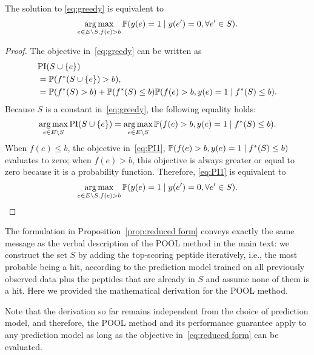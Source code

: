 \begin{proposition} \label{prop:reduced form}
  The solution to \eqref{eq:greedy} is equivalent to
  \begin{equation}
    \underset{e \in E \backslash S, f(e) > b}{\mathrm{arg}\max} \, \mathbb{P} (y(e)=1 \mid y(e') = 0, \forall e' \in S).
    \label{eq:reduced form}
  \end{equation}
\end{proposition}
\begin{proof}
  The objective in~\eqref{eq:greedy} can be written as
  \begin{equation*}
    \begin{split}
      &\text{PI}(S \cup \{e\}) \\
      &= \mathbb{P}(f^*(S\cup \{e\}) > b),\\
      &= \mathbb{P}(f^*(S) > b) + \mathbb{P}(f^*(S)\leq b) \mathbb{P}(f(e) > b, y(e) = 1 \mid f^*(S)\leq b).
    \end{split}
  \end{equation*}
  Because $S$ is a constant in~\eqref{eq:greedy}, the following equality holds:
  \begin{equation} \label{eq:PI1} 
    \underset{e \in E \backslash S}{\arg\max} \, \text{PI}(S \cup \{e\}) = \underset{e \in E \backslash S}{\arg\max} \, \mathbb{P}(f(e) > b, y(e)=1 \mid f^*(S)\leq b).
  \end{equation}
  When $f(e) \leq b$, the objective in~\eqref{eq:PI1}, $\mathbb{P}(f(e) > b, y(e) = 1 \mid f^*(S)\leq b)$ evaluates to zero; when $f(e) > b$, this objective is 
  always greater or equal to zero because it is a probability function. Therefore, \eqref{eq:PI1} is equivalent to
  \begin{equation*}
    \underset{e \in E \backslash S, f(e) > b}{\arg\max} \, \mathbb{P} (y(e) = 1 \mid y(e') = 0, \forall e' \in S). 
  \end{equation*}
\end{proof}

The formulation in Proposition~\ref{prop:reduced form} conveys exactly the same message as the verbal description of the POOL method in the main text: we
construct the set $S$ by adding the top-scoring peptide iteratively, i.e., the most probable being a hit, according to the prediction model trained on all previously
observed data plus the peptides that are already in $S$ and assume none of them is a hit. Here we provided the mathematical derivation for the POOL method.

Note that the derivation so far remains independent from the choice of prediction model, and therefore, the POOL method and its performance guarantee
apply to any prediction model as long as the objective in~\eqref{eq:reduced form} can be evaluated.

